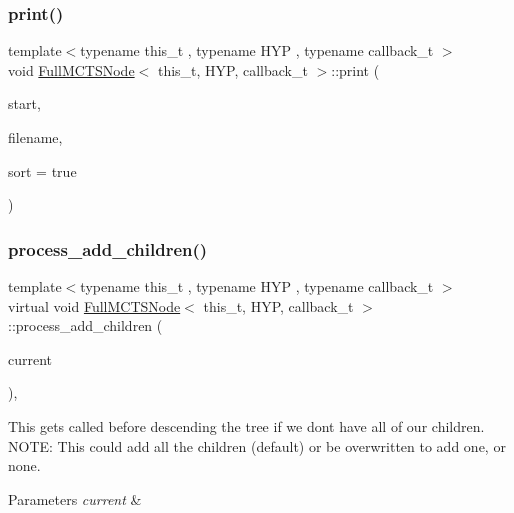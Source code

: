\subsubsection{\texorpdfstring{print()}{print()}\hspace{0.1cm}{\footnotesize\ttfamily [3/3]}}
{\footnotesize\ttfamily template$<$typename this\+\_\+t , typename H\+YP , typename callback\+\_\+t $>$ \\
void \hyperlink{class_full_m_c_t_s_node}{Full\+M\+C\+T\+S\+Node}$<$ this\+\_\+t, H\+YP, callback\+\_\+t $>$\+::print (\begin{DoxyParamCaption}\item[{H\+YP \&}]{start,  }\item[{const char $\ast$}]{filename,  }\item[{const bool}]{sort = {\ttfamily true} }\end{DoxyParamCaption})\hspace{0.3cm}{\ttfamily [inline]}}

\mbox{\label{class_full_m_c_t_s_node_a10a7bbaae53e6b6ed71207ec80c1a620}} 
\subsubsection{\texorpdfstring{process\+\_\+add\+\_\+children()}{process\_add\_children()}}
{\footnotesize\ttfamily template$<$typename this\+\_\+t , typename H\+YP , typename callback\+\_\+t $>$ \\
virtual void \hyperlink{class_full_m_c_t_s_node}{Full\+M\+C\+T\+S\+Node}$<$ this\+\_\+t, H\+YP, callback\+\_\+t $>$\+::process\+\_\+add\+\_\+children (\begin{DoxyParamCaption}\item[{H\+YP \&}]{current }\end{DoxyParamCaption})\hspace{0.3cm}{\ttfamily [inline]}, {\ttfamily [virtual]}}



This gets called before descending the tree if we don\textquotesingle{}t have all of our children. N\+O\+TE\+: This could add all the children (default) or be overwritten to add one, or none. 


\begin{DoxyParams}{Parameters}
{\em current} & \\
\hline
\end{DoxyParams}
\mbox{\label{class_full_m_c_t_s_node_adc180cfd25b033b13ac048270fb51be7}} 
